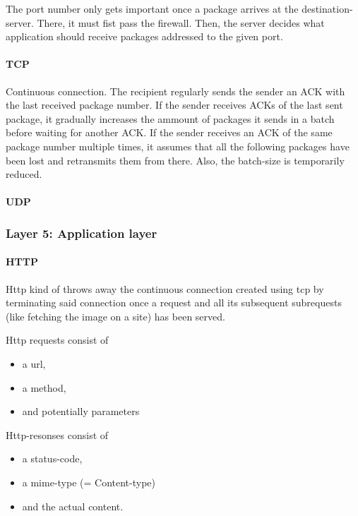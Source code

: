 The port number only gets important once a package arrives at the destination-server. 
There, it must fist pass the firewall. Then, the server decides what application should receive packages addressed to the given port. 

\paragraph{TCP} 

Continuous connection. The recipient regularly sends the sender an ACK with the last received package number. 
If the sender receives ACKs of the last sent package, it gradually increases the ammount of packages it sends in a batch before waiting for another ACK. 
If the sender receives an ACK of the same package number multiple times, it assumes that all the following packages have been lost and retransmits them from there. Also, the batch-size is temporarily reduced. 

\paragraph{UDP}

\subsubsection{Layer 5: Application layer}

\paragraph{HTTP} 

Http kind of throws away the continuous connection created using tcp by terminating said connection once a request and all its subsequent subrequests (like fetching the image on a site) has been served. 

Http requests consist of 
\begin{itemize}
    \item a url, 
    \item a method, 
    \item and potentially parameters
\end{itemize} 

Http-resonses consist of 
\begin{itemize}
    \item a status-code, 
    \item a mime-type (= Content-type) 
    \item and the actual content. 
\end{itemize}
    
